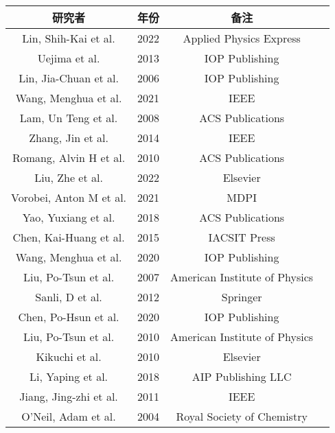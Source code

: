 \begin{center}
\begin{tabular}{cccc}
\hline
研究者 & 年份 & 备注 \\
\hline
Lin, Shih-Kai et al. \cite{linuse} & 2022 & Applied Physics Express \\
Uejima et al. \cite{uejima2013one} & 2013 & IOP Publishing \\
Lin, Jia-Chuan et al. \cite{lin2006improved} & 2006 & IOP Publishing \\
Wang, Menghua et al. \cite{wang2021highly} & 2021 & IEEE \\
Lam, Un Teng et al. \cite{lam2008processing} & 2008 & ACS Publications \\
Zhang, Jin et al. \cite{zhang2014breakdown} & 2014 & IEEE \\
Romang, Alvin H et al. \cite{romang2010supercritical} & 2010 & ACS Publications \\
Liu, Zhe et al. \cite{liu2022diffusion} & 2022 & Elsevier \\
Vorobei, Anton M et al. \cite{vorobei2021formation} & 2021 & MDPI \\
Yao, Yuxiang et al. \cite{yao2018supercritical} & 2018 & ACS Publications \\
Chen, Kai-Huang et al. \cite{chen2015electrical} & 2015 & IACSIT Press \\
Wang, Menghua et al. \cite{wang2020interface} & 2020 & IOP Publishing \\
Liu, Po-Tsun et al. \cite{liu2007effects} & 2007 & American Institute of Physics \\
Sanli, D et al. \cite{sanli2012synthesis} & 2012 & Springer \\
Chen, Po-Hsun et al. \cite{chen2020fully} & 2020 & IOP Publishing \\
Liu, Po-Tsun et al. \cite{liu2010effects} & 2010 & American Institute of Physics \\
Kikuchi et al. \cite{kikuchi2010development} & 2010 & Elsevier \\
Li, Yaping et al. \cite{li2018tuning} & 2018 & AIP Publishing LLC \\
Jiang, Jing-zhi et al. \cite{jiang2011study} & 2011 & IEEE \\
O'Neil, Adam et al. \cite{o2004green} & 2004 & Royal Society of Chemistry \\
\hline
\end{tabular}
\end{center}

